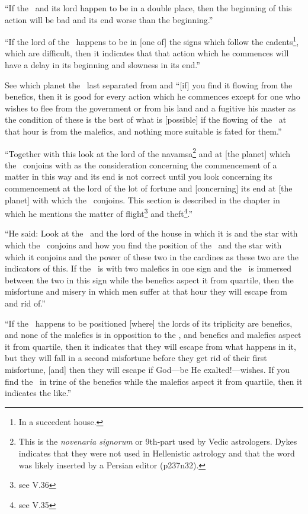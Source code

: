 ``If  the \Moon\, and its lord happen to be in a double place, then the beginning of this action will be bad and its end worse than the beginning.''

``If  the lord of the \Moon\, happens to be in [one of] the signs which follow the cadents\footnote{In a succedent house.}, which are difficult, then it indicates that that action which he commences will have a delay in its beginning and slowness in its end.''

See  which planet the \Moon\, last separated from and ``[if] you find it flowing from the benefics, then it is good for every action which he commences except for one who wishes to flee from the government or from his land and a fugitive his master as the condition of these is the best of what is [possible] if the flowing of the \Moon\, at that hour is from the malefics, and nothing more suitable is fated for them.''

``Together  with this look at the lord of the navamsa\footnote{This is the \textsl{novenaria signorum} or 9th-part used by Vedic astrologers. Dykes indicates that they were not used in Hellenistic astrology and that the word was likely inserted by a Persian editor (p237n32).} and at [the planet] which the \Moon\, conjoins with as the consideration concerning the commencement of a matter in this way and its end is not correct until you look concerning its commencement at the lord of the lot of fortune and [concerning] its end at [the planet] with which the \Moon\, conjoins. This section is described in the chapter in which he mentions the matter of flight\footnote{see V.36} and theft\footnote{see V.35}.''

``He  said: Look at the \Moon\, and the lord of the house in which it is and the star with which the \Moon\, conjoins and how you find the position of the \Moon\, and the star with which it conjoins and the power of these two in the cardines as these two are the indicators of this. If the \Moon\, is with two malefics in one sign and the \Moon\, is immersed between the two in this sign while the benefics aspect it from quartile, then the misfortune and misery in which men suffer at that hour they will escape from and rid of.''

``If  the \Moon\, happens to be positioned [where] the lords of its triplicity are benefics, and none of the malefics is in opposition to the \Moon, and benefics and malefics aspect it from quartile, then it indicates that they will escape from what happens in it, but they will fall in a second misfortune before they get rid of their first misfortune, [and] then they will escape if God---be He exalted!---wishes. If you find the \Moon\, in trine of the benefics while the malefics aspect it from quartile, then it indicates the like.''

